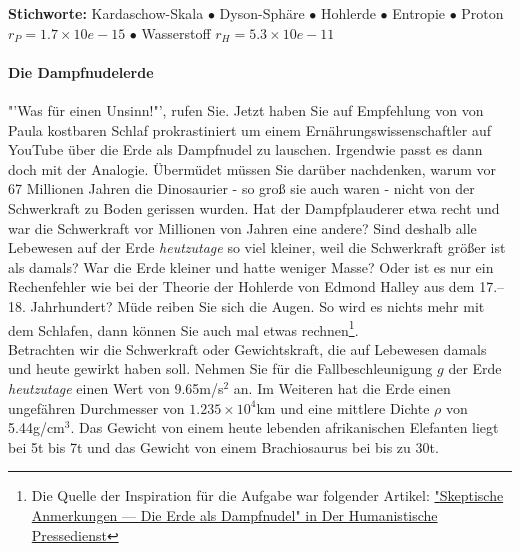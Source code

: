 \documentclass[a4paper, 9pt]{scrartcl}\usepackage[]{graphicx}\usepackage[]{xcolor}
\begin{document}
{\tiny\textbf{Stichworte:} Kardaschow-Skala $\bullet$ Dyson-Sphäre $\bullet$ Hohlerde $\bullet$ Entropie $\bullet$ Proton $r_P = 1.7 \times 10e-15$ $\bullet$ Wasserstoff $r_H = 5.3\times 10e-11$}

\paragraph{Die Dampfnudelerde}



"'Was für einen Unsinn!"', rufen Sie. Jetzt haben Sie auf Empfehlung von von Paula kostbaren Schlaf prokrastiniert um einem Ernährungswissenschaftler auf YouTube über die Erde als Dampfnudel zu lauschen. Irgendwie passt es dann doch mit der Analogie. Übermüdet müssen Sie darüber nachdenken, warum vor 67 Millionen Jahren die Dinosaurier - so groß sie auch waren - nicht von der Schwerkraft zu Boden gerissen wurden. Hat der Dampfplauderer etwa recht und war die Schwerkraft vor Millionen von Jahren eine andere?  Sind deshalb alle Lebewesen auf der Erde \textit{heutzutage} so viel kleiner, weil die Schwerkraft größer ist als damals? War die Erde kleiner und hatte weniger Masse? Oder ist es nur ein Rechenfehler wie bei der Theorie der Hohlerde von Edmond Halley aus dem 17.–18. Jahrhundert? Müde reiben Sie sich die Augen. So wird es nichts mehr mit dem Schlafen, dann können Sie auch mal etwas rechnen\footnote{Die Quelle der Inspiration
  für die Aufgabe war folgender Artikel:
  \href{https://hpd.de/artikel/erde-dampfnudel-22236}{"Skeptische Anmerkungen --- Die Erde als Dampfnudel" in Der Humanistische Pressedienst}}.  \\

Betrachten wir die Schwerkraft oder Gewichtskraft, die auf Lebewesen damals und heute gewirkt haben soll. Nehmen Sie für die Fallbeschleunigung $g$ der Erde \textit{heutzutage} einen Wert von 9.65m/s$^2$ an. Im Weiteren hat die Erde einen ungefähren Durchmesser von \ensuremath{1.235\times 10^{4}}km und eine mittlere Dichte $\rho$ von 5.44g/cm$^3$. Das Gewicht von einem heute lebenden afrikanischen Elefanten liegt bei 5t bis 7t und das Gewicht von einem Brachiosaurus bei bis zu 30t.
\end{document}
